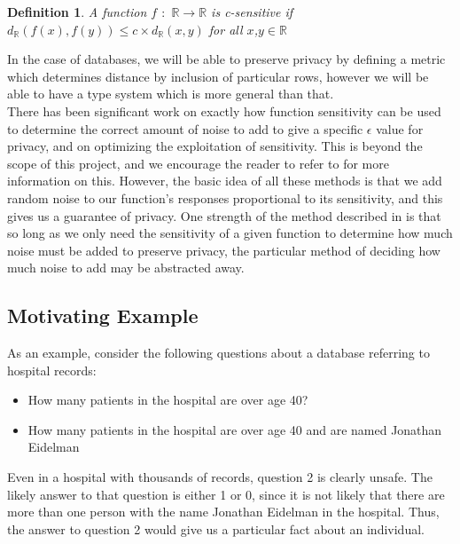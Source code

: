 \documentclass[11pt]{article}
\newtheorem{mydef}{Definition}
\begin{document}
\begin{mydef} \cite{reed2010}
  A function $f$ $:$ $\mathbb{R} \rightarrow \mathbb{R}$ is c-sensitive if $d_{\mathbb{R}}(f(x), f(y)) \leq c \times d_{\mathbb{R}}(x, y)$ for all $x$,$y\in \mathbb{R}$
\end{mydef}

In the case of databases, we will be able to preserve privacy by defining a metric which determines distance by inclusion of particular rows, however we will be able to have a type system which is more general than that. \\

There has been significant work on exactly how function sensitivity can be used to determine the correct amount of noise to add to give a specific $\epsilon$ value for privacy, and on optimizing the exploitation of sensitivity\cite{dwork2008}. This is beyond the scope of this project, and we encourage the reader to refer to \cite{dwork2008} for more information on this. However, the basic idea of all these methods is that we add random noise to our function's responses proportional to its sensitivity, and this gives us a guarantee of privacy\cite{reed2010}. One strength of the method described in \cite{reed2010} is that so long as we only need the sensitivity of a given function to determine how much noise must be added to preserve privacy, the particular method of deciding how much noise to add may be abstracted away\cite{reed2010}.

\subsection{Motivating Example}

As an example, consider the following questions about a database referring to hospital records:

\begin{itemize}
  \item[(1)] How many patients in the hospital are over age 40?
  \item[(2)] How many patients in the hospital are over age 40 and are named Jonathan Eidelman
  \end{itemize}


Even in a hospital with thousands of records, question 2 is clearly unsafe. The likely answer to that question is either 1 or 0, since it is not likely that there are more than one person with the name Jonathan Eidelman in the hospital. Thus, the answer to question 2 would give us a particular fact about an individual. \\
\end{document}
